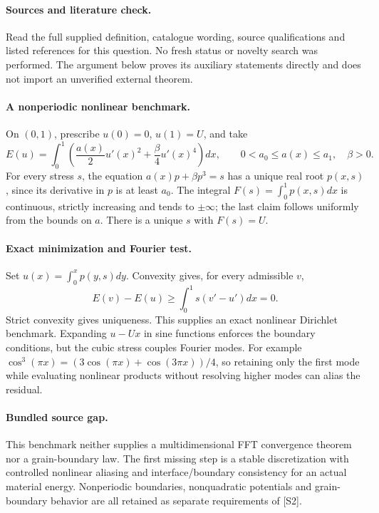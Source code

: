 \documentclass[11pt]{article}
\begin{document}
\paragraph{Sources and literature check.}
Read the full supplied definition, catalogue wording, source qualifications and listed references for this question. No fresh status or novelty search was performed. The argument below proves its auxiliary statements directly and does not import an unverified external theorem.

\paragraph{A nonperiodic nonlinear benchmark.} On \((0,1)\), prescribe \(u(0)=0\), \(u(1)=U\), and take
\[
 E(u)=\int_0^1\left(\frac{a(x)}2u'(x)^2+\frac\beta4u'(x)^4\right)dx,
 \qquad 0<a_0\leq a(x)\leq a_1,\quad\beta>0.
\]
For every stress \(s\), the equation \(a(x)p+\beta p^3=s\) has a unique real root \(p(x,s)\), since its derivative in \(p\) is at least \(a_0\). The integral \(F(s)=\int_0^1p(x,s)dx\) is continuous, strictly increasing and tends to \(\pm\infty\); the last claim follows uniformly from the bounds on \(a\). There is a unique \(s\) with \(F(s)=U\).
\paragraph{Exact minimization and Fourier test.} Set \(u(x)=\int_0^xp(y,s)dy\). Convexity gives, for every admissible \(v\),
\[
 E(v)-E(u)\geq\int_0^1s(v'-u')dx=0.
\]
Strict convexity gives uniqueness. This supplies an exact nonlinear Dirichlet benchmark. Expanding \(u-Ux\) in sine functions enforces the boundary conditions, but the cubic stress couples Fourier modes. For example \(\cos^3(\pi x)=(3\cos(\pi x)+\cos(3\pi x))/4\), so retaining only the first mode while evaluating nonlinear products without resolving higher modes can alias the residual.
\paragraph{Bundled source gap.} This benchmark neither supplies a multidimensional FFT convergence theorem nor a grain-boundary law. The first missing step is a stable discretization with controlled nonlinear aliasing and interface/boundary consistency for an actual material energy. Nonperiodic boundaries, nonquadratic potentials and grain-boundary behavior are all retained as separate requirements of [S2].
\end{document}
